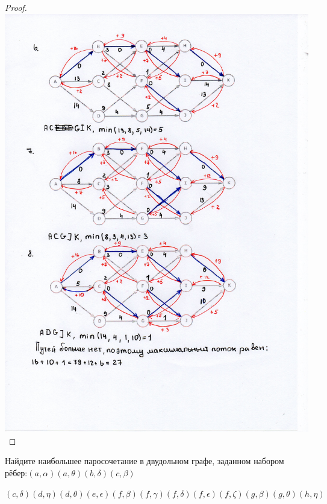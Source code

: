 \begin{proof}
    \centering\includegraphics[width=1\linewidth]{pics/14thSolution3.jpg}

\end{proof}

\begin{problem}[15]

	Найдите наибольшее паросочетание в двудольном графе, заданном набором рёбер:$(a,\alpha) (a,\theta) (b,\delta) (c,\beta)$ 
 
    $(c,\delta) (d,\eta) (d,\theta) (e,\epsilon) (f,\beta) (f,\gamma) (f,\delta) (f,\epsilon) (f,\zeta) (g,\beta) (g,\theta) (h,\eta)$
    
\end{problem}

